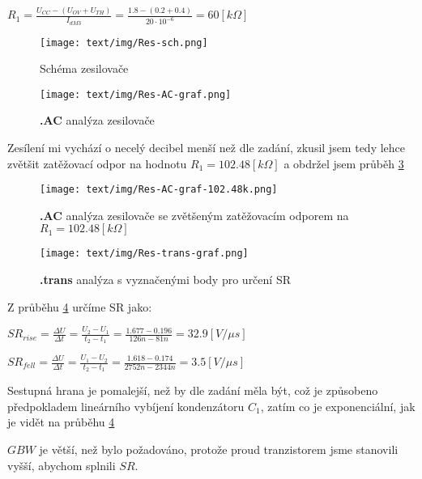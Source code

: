 \begin{center}
    \Large
    \(
        R_1 = \frac{U_{CC}-(U_{OV}+U_{TH})}{I_{dM3}} = \frac{1.8 - (0.2+0.4)}{20 \cdot 10^{-6}} = 60 [k\Omega]
    \)
\end{center}

\vspace{10mm}
\begin{figure}[h!]
    \centering
    \texttt{[image: text/img/Res-sch.png]}
    \caption{\label{fig:res-sch} Schéma zesilovače}
\end{figure}

\vspace{10mm}
\begin{figure}[h!]
    \centering
    \texttt{[image: text/img/Res-AC-graf.png]}
    \caption{\label{fig:res-AC} {\bf .AC} analýza zesilovače}
\end{figure}
Zesílení mi vychází o necelý decibel menší než dle zadání, zkusil jsem tedy lehce zvětšit zatěžovací odpor na hodnotu \(R_1 = 102.48 [k\Omega]\) a obdržel jsem průběh \ref{fig:res-AC-102.48k}

\begin{figure}[h!]
    \centering
    \texttt{[image: text/img/Res-AC-graf-102.48k.png]}
    \caption{\label{fig:res-AC-102.48k} {\bf .AC} analýza zesilovače se zvětšeným zatěžovacím odporem na \(R_1 = 102.48 [k\Omega]\)}
\end{figure}

\vspace{10mm}
\begin{figure}[h!]
    \centering
    \texttt{[image: text/img/Res-trans-graf.png]}
    \caption{\label{fig:res-SR} {\bf .trans} analýza s vyznačenými body pro určení SR}
\end{figure}

Z průběhu \ref{fig:res-SR} určíme SR jako:
\begin{center}
    \Large
    \(
        SR_{rise} = \frac{\Delta U}{\Delta t} = \frac{U_2 - U_1}{t_2 - t_1} = \frac{1.677 - 0.196}{126n - 81n} = 32.9 [V/\mu s]
    \)

    \(
        SR_{fell} = \frac{\Delta U}{\Delta t} = \frac{U_1 - U_2}{t_2 - t_1} = \frac{1.618 - 0.174}{2752n - 2344n} = 3.5 [V/\mu s]
    \)
\end{center}

Sestupná hrana je pomalejší, než by dle zadání měla být, což je způsobeno předpokladem lineárního vybíjení kondenzátoru \(C_1\), zatím co je exponenciální, jak je vidět na průběhu \ref{fig:res-SR}

\(GBW\) je větší, než bylo požadováno, protože proud tranzistorem jsme stanovili vyšší, abychom splnili \(SR\).